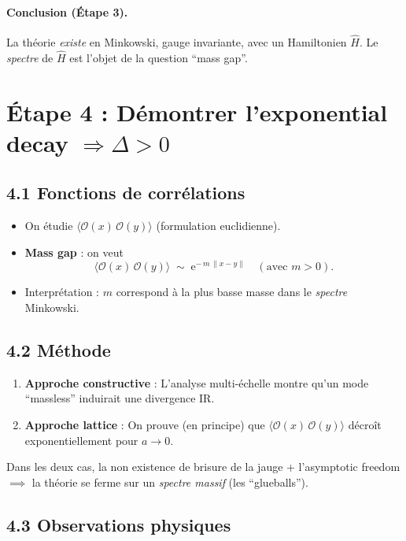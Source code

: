 \documentclass[11pt]{article}
\begin{document}
\paragraph{Conclusion (Étape 3).}
La théorie \emph{existe} en Minkowski, gauge invariante, avec un Hamiltonien $\hat{H}$. Le \emph{spectre} de $\hat{H}$ est l'objet de la question “mass gap”.

\section*{Étape 4 : Démontrer l’exponential decay \(\Rightarrow \Delta>0\)}

\subsection*{4.1 Fonctions de corrélations}

\begin{itemize}
  \item On étudie $\langle \mathcal{O}(x)\,\mathcal{O}(y)\rangle$ (formulation euclidienne).
  \item \textbf{Mass gap} : on veut
  \[
    \langle \mathcal{O}(x)\,\mathcal{O}(y)\rangle
    \;\sim\;
    \mathrm{e}^{-\,m\,\|x-y\|}
    \quad(\text{avec }m>0).
  \]
  \item Interprétation : $m$ correspond à la plus basse masse dans le \emph{spectre} Minkowski.
\end{itemize}

\subsection*{4.2 Méthode}

\begin{enumerate}
  \item \textbf{Approche constructive} : L'analyse multi-échelle montre qu'un mode “massless” induirait une divergence IR.
  \item \textbf{Approche lattice} : On prouve (en principe) que $\langle \mathcal{O}(x)\,\mathcal{O}(y)\rangle$ décroît exponentiellement pour $a\to0$.
\end{enumerate}

\noindent
Dans les deux cas, la non existence de brisure de la jauge + l'asymptotic freedom $\implies$ la théorie se ferme sur un \emph{spectre massif} (les “glueballs”).

\subsection*{4.3 Observations physiques}
\end{document}
